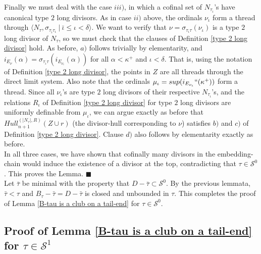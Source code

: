 \documentclass[12pt]{article}
\begin{document}
Finally we must deal with the case $iii)$, in which a cofinal set of $N_{\tau_\iota}$'s have canonical type $2$ long divisors.  As in case $ii)$ above, the ordinals $\nu_\iota$ form a thread through $\langle N_\tau , \sigma_{\tau_{\bar{\iota}}  \tau_\iota } \ | \ \bar{\iota} \leq \iota < \delta \rangle$.  We want to verify that $\nu = \sigma_{\tau_\iota  \tau} ( \nu_\iota )$ is a type $2$ long divisor of $N_\tau$, so we must check that the clauses of Definition \ref{type 2 long divisor} hold.  As before, $a)$ follows trivially by elementarity, and $i_{E_\nu} (\alpha) = \sigma_{\tau_{\iota}  \tau }( i_{E_{\nu_\iota}} (\alpha))$ for all $\alpha < \kappa^+$ and $\iota < \delta$.  That is, using the notation of Definition \ref{type 2 long divisor}, the points in $Z$ are all threads through the direct limit system.  Also note that the ordinals $\mu_\iota = sup ( i_{E_{\nu_\iota}}``(\kappa^+))$ form a thread.  Since all $\nu_\iota$'s are type $2$ long divisors of their respective $N_{\tau_\iota}$'s, and the relations $R_\iota$ of Definition \ref{type 2 long divisor} for type $2$ long divisors are uniformly definable from $\mu_\iota$, we can argue exactly as before that $Hull_{n+1}^{( |N_\tau | , R )} ( Z \cup r )$ (the divisor-hull corresponding to $\nu$) satisfies $b)$ and $c)$ of Definition \ref{type 2 long divisor}.  Clause $d)$ also follows by elementarity exactly as before.\\
 


In all three cases, we have shown that cofinally many divisors in the embedding-chain would induce the existence of a divisor at the top, contradicting that $\tau \in \mathcal{S}^0$.  This proves the Lemma. $\blacksquare$\\



Let $\bar{\tau}$ be minimal with the property that $D - \bar{\tau} \subset \mathcal{S}^0$.  By the previous lemmata, $\bar{\tau} < \tau$ and $B_\tau - \bar{\tau} = D - \bar{\tau}$ is closed and unbounded in $\tau$.  This completes the proof of Lemma \ref{B-tau is a club on a tail-end} for $\tau \in \mathcal{S}^0$.\\










\subsection{Proof of Lemma \ref{B-tau is a club on a tail-end} for $\tau \in \mathcal{S}^1$}
\end{document}
